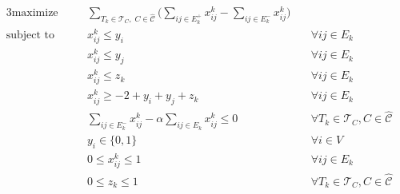 \begin{alignat}{3}
	\label{eq:ecp-exact1}
	\text{maximize}     &                                                 & \sum_{ T_{k} \in \mathcal{T}_{C}, \; C \in
		\mathcal{\hat{C}} } \big( \sum^{}_{ij \in E^{+}_k } x_{ij}
	^{k} - \sum_{ij \in E^{-}_k } x_{ij} ^{k} \big)                                                                                                                                               \\
	\label{eq:ecp-v1}
	\text{subject to}   & \quad                                           & x _{ij}^{k}  \leq y_i                                               & \quad \forall ij \in E_k                        \\
	\label{eq:ecp-v2}
	                    &                                                 & x _{ij}^{k}  \leq y_j                                               & \quad \forall ij \in E_k                        \\
	\label{eq:ecp-t1}
	                    &                                                 & x _{ij}^{k}  \leq z_k                                               & \quad \forall ij \in E_k                        \\
	\label{eq:ecp-e1}
	                    &                                                 & x _{ij} ^{k} \geq - 2 + y_i + y_j + z_k                             & \quad \forall ij \in E_k                        \\
	\label{eq:ecp-alpha-constraint1}
	                    &                                                 & \sum^{}_{ij \in E_k^{-} } x_{ij}^{k}  - \alpha \sum^{}_{ij \in E_k}
	x_{ij} ^{k}  \leq 0 & \quad \forall T_{k} \in \mathcal{T} _{C}, C \in
	\hat{\mathcal{C}}                                                                                                                                                                             \\
	\label{eq:ecp-vertex-def1}
	                    &                                                 & y _{i} \in  \{0, 1\}                                                & \quad \forall i \in V                           \\
	\label{eq:ecp-edge-def1}
	                    &                                                 & 0 \leq x _{ij} ^{k}  \leq 1                                         & \quad \forall ij \in E_k                        \\
	\label{eq:ecp-thread-def1}
	                    &                                                 & 0 \leq z _{k} \leq 1                                                & \quad \forall T_{k} \in \mathcal{T} _{C}, C \in
	\hat{\mathcal{C}}
\end{alignat}

